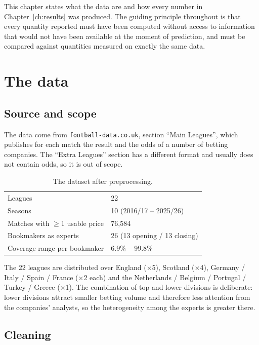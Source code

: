 \documentclass[12pt,a4paper,oneside]{report}
\newcommand{\file}[1]{\texttt{#1}}
\renewcommand{\_}{\oldunderscore\allowbreak}
\theoremstyle{definition}
\theoremstyle{plain}
\theoremstyle{remark}
\begin{document}
This chapter states what the data are and how every number in Chapter~\ref{ch:results} was
produced. The guiding principle throughout is that every quantity reported must have been
computed without access to information that would not have been available at the moment of
prediction, and must be compared against quantities measured on exactly the same data.

\section{The data}

\subsection{Source and scope}

The data come from \file{football-data.co.uk}, section ``Main Leagues'', which publishes for each
match the result and the odds of a number of betting companies. The ``Extra Leagues'' section has
a different format and usually does not contain odds, so it is out of scope.

\begin{table}[H]
\centering
\begin{tabular}{@{}ll@{}}
\toprule
Leagues & 22 \\
Seasons & 10 (2016/17 -- 2025/26) \\
Matches with $\geq$1 usable price & 76,584 \\
Bookmakers as experts & 26 (13 opening / 13 closing) \\
Coverage range per bookmaker & 6.9\% -- 99.8\% \\
\bottomrule
\end{tabular}
\caption{The dataset after preprocessing.}
\end{table}

The 22 leagues are distributed over England ($\times$5), Scotland ($\times$4),
Germany / Italy / Spain / France ($\times$2 each) and the Netherlands / Belgium /
Portugal / Turkey / Greece ($\times$1). The combination of top and lower divisions is
deliberate: lower divisions attract smaller betting volume and therefore less attention from the
companies' analysts, so the heterogeneity among the experts is greater there.

\subsection{Cleaning}
\label{sec:data-clean}
\end{document}
